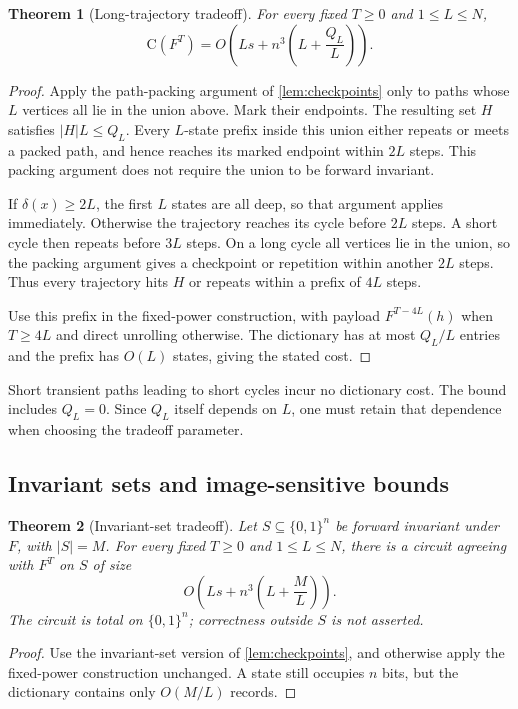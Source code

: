 \documentclass[11pt]{article}
\newtheorem{theorem}{Theorem}[section]
\theoremstyle{definition}
\theoremstyle{remark}
\newcommand{\bits}{\{0,1\}}
\newcommand{\CC}{\mathrm{C}}
\numberwithin{equation}{section}
\begin{document}
\begin{theorem}[Long-trajectory tradeoff]\label{thm:active-mass}
For every fixed $T\geq0$ and $1\leq L\leq N$,
\[
 \CC(F^T)=O\!\left(Ls+n^3\left(L+\frac{Q_L}{L}\right)\right).
\]
\end{theorem}

\begin{proof}
Apply the path-packing argument of \cref{lem:checkpoints} only to paths
whose $L$ vertices all lie in the union above.  Mark their endpoints.
The resulting set $H$ satisfies $|H|L\leq Q_L$.  Every $L$-state prefix
inside this union either repeats or meets a packed path, and hence reaches
its marked endpoint within $2L$ steps.  This packing argument does not
require the union to be forward invariant.

If $\delta(x)\geq2L$, the first $L$ states are all deep, so that argument
applies immediately.  Otherwise the trajectory reaches its cycle before
$2L$ steps.  A short cycle then repeats before $3L$ steps.  On a long
cycle all vertices lie in the union, so the packing argument gives a
checkpoint or repetition within another $2L$ steps.  Thus every trajectory
hits $H$ or repeats within a prefix of $4L$ steps.

Use this prefix in the fixed-power construction, with payload
$F^{T-4L}(h)$ when $T\geq4L$ and direct unrolling otherwise.  The
dictionary has at most $Q_L/L$ entries and the prefix has $O(L)$ states,
giving the stated cost.
\end{proof}

Short transient paths leading to short cycles incur no dictionary cost.
The bound includes $Q_L=0$.  Since $Q_L$ itself depends on $L$, one must
retain that dependence when choosing the tradeoff parameter.

\subsection{Invariant sets and image-sensitive bounds}

\begin{theorem}[Invariant-set tradeoff]\label{thm:invariant}
Let $S\subseteq\bits^n$ be forward invariant under $F$, with $|S|=M$.
For every fixed $T\geq0$ and $1\leq L\leq N$, there is a circuit agreeing
with $F^T$ on $S$ of size
\[
 O\!\left(Ls+n^3\left(L+\frac{M}{L}\right)\right).
\]
The circuit is total on $\bits^n$; correctness outside $S$ is not asserted.
\end{theorem}
\begin{proof}
Use the invariant-set version of \cref{lem:checkpoints}, and otherwise
apply the fixed-power construction unchanged.  A state still occupies
$n$ bits, but the dictionary contains only $O(M/L)$ records.
\end{proof}
\end{document}
